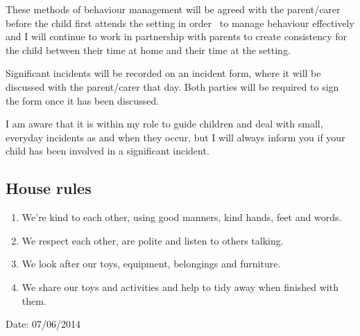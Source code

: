 \documentclass[10pt]{article}
\begin{document}
These methods of behaviour management will be agreed with the
parent/carer before the child first attends the setting in order ~to
manage behaviour effectively and I will continue to work in partnership
with parents to create consistency for the child between their time at
home and their time at the setting.

Significant incidents will be recorded on an incident form, where it
will be discussed with the parent/carer that day. Both parties will be
required to sign the form once it has been discussed.

I am aware that it is within my role to guide children and deal with
small, everyday incidents as and when they occur, but I will always
inform you if your child has been involved in a significant incident.

\subsection{House rules}

\begin{enumerate}
\item
  We're kind to each other, using good manners, kind hands, feet and
  words. ~
\item
  We respect each other, are polite and listen to others talking.~
\item
  We look after our toys, equipment, belongings and furniture.~
\item
  We share our toys and activities and help to tidy away when finished
  with them.~
\end{enumerate}

Date: 07/06/2014

~
\end{document}
